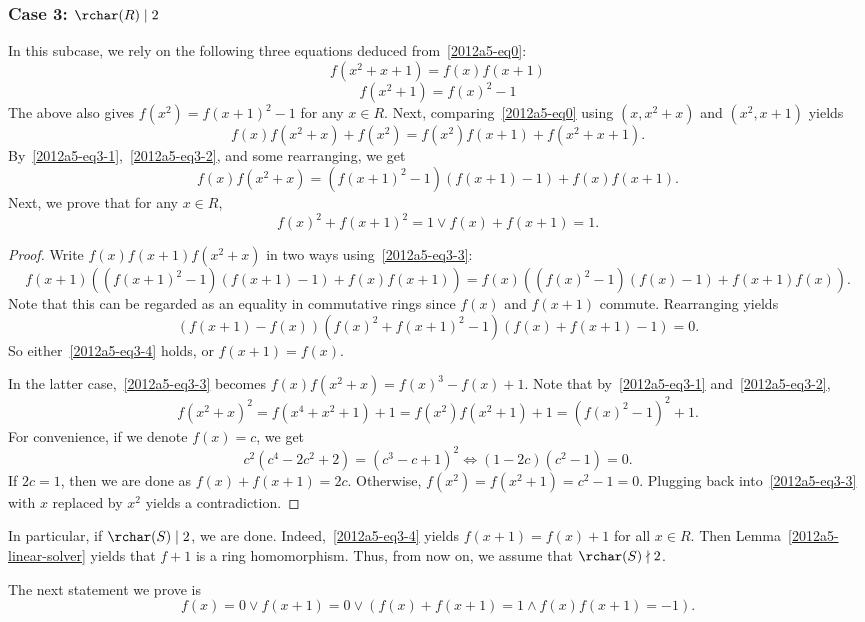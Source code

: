 \subsubsection*{Case 3: $\rchar(R) \mid 2$}

In this subcase, we rely on the following three equations deduced from~\eqref{2012a5-eq0}:
\[ f(x^2 + x + 1) = f(x) f(x + 1) \tag{3.1}\label{2012a5-eq3-1} \]
\[ f(x^2 + 1) = f(x)^2 - 1 \tag{3.2}\label{2012a5-eq3-2} \]
The above also gives $f(x^2) = f(x + 1)^2 - 1$ for any $x \in R$.
Next, comparing~\eqref{2012a5-eq0} using $(x, x^2 + x)$ and $(x^2, x + 1)$ yields
\[ f(x) f(x^2 + x) + f(x^2) = f(x^2) f(x + 1) + f(x^2 + x + 1). \]
By~\eqref{2012a5-eq3-1},~\eqref{2012a5-eq3-2}, and some rearranging, we get
\[ f(x) f(x^2 + x) = (f(x + 1)^2 - 1)(f(x + 1) - 1) + f(x) f(x + 1). \tag{3.3}\label{2012a5-eq3-3} \]
Next, we prove that for any $x \in R$,
\[ f(x)^2 + f(x + 1)^2 = 1 \vee f(x) + f(x + 1) = 1. \tag{3.4}\label{2012a5-eq3-4} \]

\begin{proof}
Write $f(x) f(x + 1) f(x^2 + x)$ in two ways using~\eqref{2012a5-eq3-3}:
\[ f(x + 1) ((f(x + 1)^2 - 1)(f(x + 1) - 1) + f(x) f(x + 1)) = f(x) ((f(x)^2 - 1)(f(x) - 1) + f(x + 1) f(x)). \]
Note that this can be regarded as an equality in commutative rings since $f(x)$ and $f(x + 1)$ commute.
Rearranging yields
\[ (f(x + 1) - f(x))(f(x)^2 + f(x + 1)^2 - 1)(f(x) + f(x + 1) - 1) = 0. \]
So either~\eqref{2012a5-eq3-4} holds, or $f(x + 1) = f(x)$.

In the latter case,~\eqref{2012a5-eq3-3} becomes $f(x) f(x^2 + x) = f(x)^3 - f(x) + 1$.
Note that by~\eqref{2012a5-eq3-1} and~\eqref{2012a5-eq3-2},
\[ f(x^2 + x)^2 = f(x^4 + x^2 + 1) + 1 = f(x^2) f(x^2 + 1) + 1 = (f(x)^2 - 1)^2 + 1. \]
For convenience, if we denote $f(x) = c$, we get
\[ c^2 (c^4 - 2c^2 + 2) = (c^3 - c + 1)^2 \iff (1 - 2c)(c^2 - 1) = 0. \]
If $2c = 1$, then we are done as $f(x) + f(x + 1) = 2c$.
Otherwise, $f(x^2) = f(x^2 + 1) = c^2 - 1 = 0$.
Plugging back into~\eqref{2012a5-eq3-3} with $x$ replaced by $x^2$ yields a contradiction.
\end{proof}

In particular, if $\rchar(S) \mid 2$, we are done.
Indeed,~\eqref{2012a5-eq3-4} yields $f(x + 1) = f(x) + 1$ for all $x \in R$.
Then Lemma~\ref{2012a5-linear-solver} yields that $f + 1$ is a ring homomorphism.
Thus, from now on, we assume that $\rchar(S) \nmid 2$.

The next statement we prove is
\[ f(x) = 0 \vee f(x + 1) = 0 \vee (f(x) + f(x + 1) = 1 \wedge f(x) f(x + 1) = -1). \tag{3.5}\label{2012a5-eq3-5} \]

